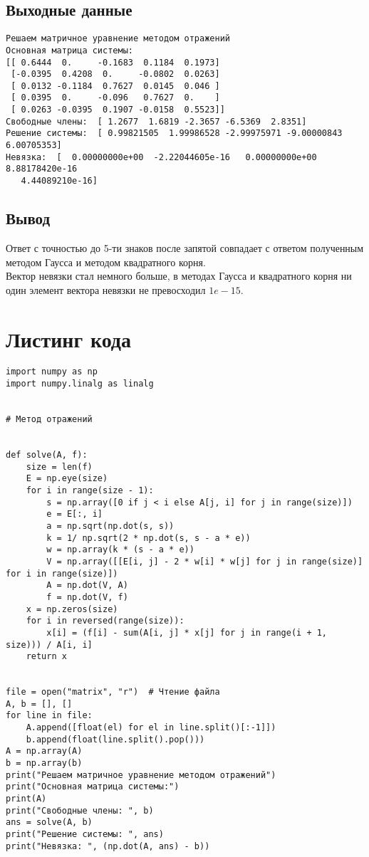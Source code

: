\documentclass[11.4pt]{article}
\begin{document}
	\subsection{Выходные данные}
\begin{verbatim}
Решаем матричное уравнение методом отражений
Основная матрица системы:
[[ 0.6444  0.     -0.1683  0.1184  0.1973]
 [-0.0395  0.4208  0.     -0.0802  0.0263]
 [ 0.0132 -0.1184  0.7627  0.0145  0.046 ]
 [ 0.0395  0.     -0.096   0.7627  0.    ]
 [ 0.0263 -0.0395  0.1907 -0.0158  0.5523]]
Свободные члены:  [ 1.2677  1.6819 -2.3657 -6.5369  2.8351]
Решение системы:  [ 0.99821505  1.99986528 -2.99975971 -9.00000843  6.00705353]
Невязка:  [  0.00000000e+00  -2.22044605e-16   0.00000000e+00   8.88178420e-16
   4.44089210e-16]
 \end{verbatim}
	\subsection{Вывод}
		Ответ с точностью до 5-ти знаков после запятой совпадает с ответом 				полученным методом Гаусса и методом квадратного корня.\\
		Вектор невязки стал немного больше, в методах Гаусса и квадратного 				корня ни один элемент вектора невязки не превосходил $1e-15$.
\newpage
\section{Листинг кода}
\begin{verbatim}
import numpy as np
import numpy.linalg as linalg


# Метод отражений


def solve(A, f):
    size = len(f)
    E = np.eye(size)
    for i in range(size - 1):
        s = np.array([0 if j < i else A[j, i] for j in range(size)])
        e = E[:, i]
        a = np.sqrt(np.dot(s, s))
        k = 1/ np.sqrt(2 * np.dot(s, s - a * e))
        w = np.array(k * (s - a * e))
        V = np.array([[E[i, j] - 2 * w[i] * w[j] for j in range(size)] for i in range(size)])
        A = np.dot(V, A)
        f = np.dot(V, f)
    x = np.zeros(size)
    for i in reversed(range(size)):
        x[i] = (f[i] - sum(A[i, j] * x[j] for j in range(i + 1, size))) / A[i, i]
    return x


file = open("matrix", "r")  # Чтение файла
A, b = [], []
for line in file:
    A.append([float(el) for el in line.split()[:-1]])
    b.append(float(line.split().pop()))
A = np.array(A)
b = np.array(b)
print("Решаем матричное уравнение методом отражений")
print("Основная матрица системы:")
print(A)
print("Свободные члены: ", b)
ans = solve(A, b)
print("Решение системы: ", ans)
print("Невязка: ", (np.dot(A, ans) - b))
\end{verbatim}
\end{document}
